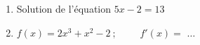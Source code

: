 \documentclass[a4paper,11pt,landscape,exos]{nsi} %
\begin{document}
\begin{multicols}{2}
\begin{enumerate}[itemsep=.9em]
	\item Solution de l'équation $5x-2=13$

	
	\item $f(x)=2x^3+x^2-2\ ; \qquad$
    $f'(x)=$ $\ldots$
\end{enumerate}
\end{multicols}
\end{document}
